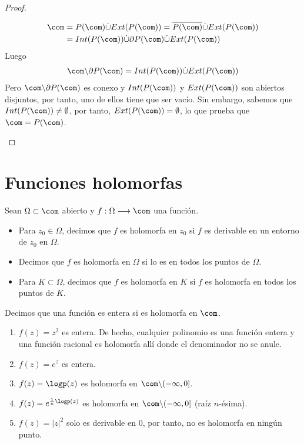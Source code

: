 \begin{proof}
\begin{enumerate}
\begin{align*}
        \com &= P(\com) \dot\cup Ext(P(\com)) = \overline{P(\com)} \dot\cup Ext(P(\com)) \\
        &= Int(P(\com)) \dot\cup \partial P(\com) \dot\cup Ext(P(\com))
    \end{align*}
    Luego
    \begin{align*}
        \com \backslash \partial P(\com) = Int(P(\com)) \dot\cup Ext(P(\com))
    \end{align*}
    Pero $\com \backslash \partial P(\com)$ es conexo y $Int(P(\com))$ y $Ext(P(\com))$ son abiertos disjuntos, por tanto, uno de ellos tiene que ser vacío. Sin embargo, sabemos que $Int(P(\com)) \not = \emptyset$, por tanto, $Ext(P(\com)) = \emptyset$, lo que prueba que $\com = P(\com)$.
\end{enumerate}
\end{proof}

\section{Funciones holomorfas}

\begin{defi}
Sean $\Omega \subset \com$ abierto y $f: \Omega \longrightarrow \com$ una función.
\begin{itemize}
    \item Para $z_0 \in \Omega$, decimos que $f$ es holomorfa en $z_0$ si $f$ es derivable en un entorno de $z_0$ en $\Omega$.
    \item Decimos que $f$ es holomorfa en $\Omega$ si lo es en todos los puntos de $\Omega$.
    \item Para $K \subset \Omega$, decimos que $f$ es holomorfa en $K$ si $f$ es holomorfa en todos los puntos de $K$.
\end{itemize}
\end{defi}

\begin{defi}
Decimos que una función es entera si es holomorfa en $\com$.
\end{defi}

\begin{ejemplo}
\begin{enumerate}
    \item $f(z) = z^2$ es entera. De hecho, cualquier polinomio es una función entera y una función racional es holomorfa allí donde el denominador no se anule.
    \item $f(z)= e^z$ es entera.
    \item $f(z) = \logp(z)$ es holomorfa en $\com \backslash (-\infty,0]$.
    \item $f(z) = e^{\frac{1}{n}\logp(z)}$ es  holomorfa en $\com \backslash (-\infty,0]$ (raíz $n$-ésima).
    \item $f(z) = |z|^2$ solo es derivable en $0$, por tanto, no es holomorfa en ningún punto.
\end{enumerate}
\end{ejemplo}

